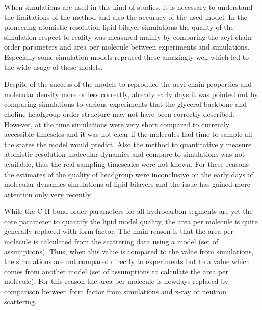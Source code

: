 \documentclass[aps,prl,superscriptaddress,twocolumn]{revtex4}
\begin{document}
When simulations are used in this kind of studies, it is necessary to understand
the limitations of the method and also the accuracy of the used model.
In the pioneering atomistic resolution lipid bilayer simulations the quality of
the simulation respect to reality was measured mainly by comparing the 
acyl chain order parameters and area per molecule between experiments and
simulations. Especially some simulation models repruced these amazingly well
which led to the wide usage of these models.

Despite of the success of the models to reproduce the acyl chain properties and
molecular density more or less correctly, already early days it was pointed out
by comparing simulations to various experiments
that the glycerol backbone and choline headgroup order structure may not have been 
correctly described. However, at the time simulations were very short compared
to currently accessible timescles and it was not clear if the molecules had
time to sample all the states the model would predict. Also the method to 
quantitatively measure atomistic resolution molecular dynamics and compare to
simulations was not available, thus the real sampling timescales were not known.
For these reasons the estimates of the quality of headgroup were inconclusive on
the early days of molecular dynamics simulations of lipid bilayers and
the issue has gained more attention only very recently.

While the C-H bond order parameters for all hydrocarbon segments are yet the
core parameter to quantify the lipid model quality, the area per molecule 
is quite generally replaced with form factor.
The main reason is that the area per molecule is calculated from the scattering
data using a model (set of assumptions). Thus, when this value is compared to
the value from simulations, the simulations are not compared directly to experiments
but to a value which comes from another model (set of assumptions to calculate the
area per molecule). For this reason the area per molecule is nowdays replaced
by comparison between form factor from simulations and x-ray or neutron scattering.
\end{document}
